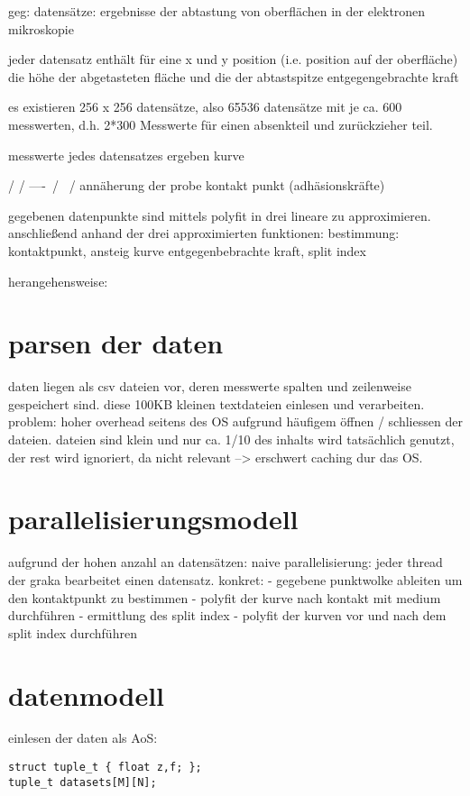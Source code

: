 geg: datensätze: ergebnisse der abtastung von oberflächen in der elektronen mikroskopie


jeder datensatz enthält für eine x und y position (i.e. position auf der oberfläche) die höhe der abgetasteten fläche und die der abtastspitze entgegengebrachte kraft

es existieren 256 x 256 datensätze, also 65536 datensätze mit je ca. 600 messwerten, d.h. 2*300 Messwerte für einen absenkteil und zurückzieher teil.

messwerte jedes datensatzes ergeben kurve

           /
          /
----\    /
     \  /
      \/
 annäherung der probe
       kontakt punkt (adhäsionskräfte)
         
gegebenen datenpunkte sind mittels polyfit  in drei lineare zu approximieren. anschließend anhand der drei approximierten funktionen: bestimmung: kontaktpunkt, ansteig kurve entgegenbebrachte kraft, split index

herangehensweise: 

\section{parsen der daten}
daten liegen als csv dateien vor, deren messwerte spalten und zeilenweise gespeichert sind. diese 100KB kleinen textdateien einlesen und verarbeiten.
problem: hoher overhead seitens des OS aufgrund häufigem öffnen / schliessen der dateien. dateien sind klein und nur ca. 1/10 des inhalts wird tatsächlich genutzt, der rest wird ignoriert, da nicht relevant --> erschwert caching dur das OS.

\section{parallelisierungsmodell}
aufgrund der hohen anzahl an datensätzen: naive parallelisierung: jeder thread der graka bearbeitet einen datensatz. konkret:
- gegebene punktwolke ableiten um den kontaktpunkt zu bestimmen
- polyfit der kurve nach kontakt mit medium durchführen
- ermittlung des split index
- polyfit der kurven vor und nach dem split index durchführen

\section{datenmodell}
einlesen der daten als AoS:

\begin{lstlisting}
struct tuple_t { float z,f; };
tuple_t datasets[M][N];
\end{lstlisting}

